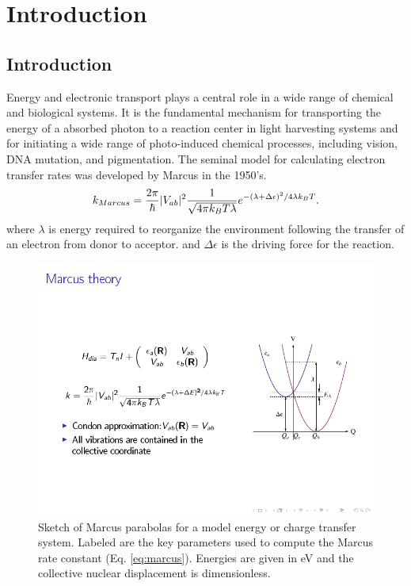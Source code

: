 \chapter{Introduction}
\section{Introduction}

Energy and electronic transport plays a central role in a
wide range of  chemical  and biological systems.
It is the fundamental mechanism for transporting the  energy  of a
absorbed photon to a reaction center in light harvesting systems
and for initiating a wide range of photo-induced  chemical processes,
including vision, DNA mutation, and pigmentation.
The seminal model for calculating electron transfer rates was developed by
Marcus in the 1950's\cite{marcus1956theory,marcus1965theory,marcus1993electron}.
\begin{equation}
k_{Marcus}=\frac{2\pi}{\hbar}|V_{ab}|^{2}\frac{1}{\sqrt{4\text{\ensuremath{\pi}}k_{B}T\lambda}}e^{-(\lambda+ \Delta\epsilon)^{2}/4\text{\ensuremath{\lambda}}k_{B}T}.\label{eq:marcus}
\end{equation}
where $\lambda$ is  energy required to reorganize the environment
following the transfer of an electron from donor to acceptor.
and $\Delta \epsilon$ is the driving force for the reaction.

\begin{figure}[h]
\includegraphics[width=0.5\columnwidth]{Chapters/chap2/Figure1}
\caption{Sketch of Marcus parabolas for a model energy or charge transfer system.
Labeled are the key parameters used to compute the Marcus rate constant (Eq. \ref{eq:marcus}).
Energies are given in eV and the collective nuclear displacement  is dimensionless.
}
\label{marcus}
\end{figure}


